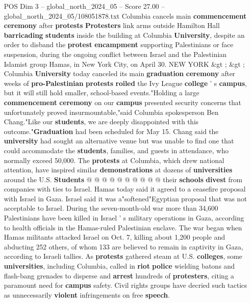 \begin{textsample}{POS Dim 3 – global\_north\_2024\_05 – Score 27.00 – global\_north\_2024\_05/108051878.txt}  \label{ex:f3_pos_010}
Columbia cancels main \textbf{commencement} \textbf{ceremony} after \textbf{protests} \textbf{Protesters} link arms outside Hamilton Hall \textbf{barricading} \textbf{students} inside the building at Columbia \textbf{University}, despite an order to disband the \textbf{protest} \textbf{encampment} supporting Palestinians or face suspension, during the ongoing conflict between Israel and the Palestinian Islamist group Hamas, in New York City, on April 30.
NEW YORK \&gt ; \&gt ; Columbia \textbf{University} today canceled its main \textbf{graduation} \textbf{ceremony} after weeks of \textbf{pro-Palestinian} \textbf{protests} \textbf{roiled} the Ivy League \textbf{college} ' s \textbf{campus}, but it will still hold smaller, school-based events."Holding a large \textbf{commencement} \textbf{ceremony} on our \textbf{campus} presented security concerns that unfortunately proved insurmountable,"said Columbia spokesperson Ben Chang."Like our \textbf{students}, we are deeply disappointed with this outcome."\textbf{Graduation} had been scheduled for May 15.
Chang said the \textbf{university} had sought an alternative venue but was unable to find one that could accommodate the \textbf{students}, families, and guests in attendance, who normally exceed 50,000.
The \textbf{protests} at Columbia, which drew national attention, have inspired similar \textbf{demonstrations} at dozens of \textbf{universities} around the U.S. \textbf{Students} @ @ @ @ @ @ @ @ @ @ their \textbf{schools} \textbf{divest} from companies with ties to Israel.
Hamas today said it agreed to a ceasefire proposal with Israel in Gaza.
Israel said it was a"softened"Egyptian proposal that was not acceptable to Israel.
During the seven-month-old war more than 34,600 Palestinians have been killed in Israel ' s military operations in Gaza, according to health officials in the Hamas-ruled Palestinian enclave.
The war began when Hamas militants attacked Israel on Oct. 7, killing about 1,200 people and abducting 252 others, of whom 133 are believed to remain in captivity in Gaza, according to Israeli tallies.
As \textbf{protests} gathered steam at U.S. \textbf{colleges}, some \textbf{universities}, including Columbia, called in \textbf{riot} \textbf{police} wielding batons and flash-bang grenades to disperse and \textbf{arrest} hundreds of \textbf{protesters}, citing a paramount need for \textbf{campus} safety.
Civil rights groups have decried such tactics as unnecessarily \textbf{violent} infringements on free \textbf{speech}.

\end{textsample}
